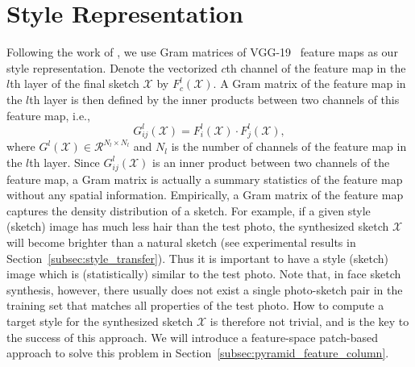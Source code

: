 \documentclass[10pt,twocolumn,letterpaper]{article}
\begin{document}
\section{Style Representation}\label{sec:motivation}
Following the work of \cite{gatys2015neural}, we use Gram matrices of VGG-19~\cite{simonyan2014very} feature maps as our style representation. Denote the vectorized $c$th channel of the feature map in the $l$th layer of the final sketch $\mathcal{X}$ by $F^{l}_{c}(\mathcal{X})$. A Gram matrix of the feature map in the $l$th layer is then defined by the inner products between two channels of this feature map, i.e.,
\begin{equation}
G^l_{ij}(\mathcal{X}) = F^l_{i}(\mathcal{X}) \cdot F^l_{j}(\mathcal{X}), %
\label{eq:Gram_element}
\end{equation}
where $G^l(\mathcal{X}) \in {\mathcal{R}^{N_l \times N_l}}$ %
and $N_l$ is the number of channels of the feature map in the $l$th layer. Since $G^l_{ij}(\mathcal{X})$ is an inner product between two channels of the feature map, a Gram matrix is actually a summary statistics of the feature map without any spatial information. Empirically, a Gram matrix of the feature map captures the density distribution of a sketch. For example, if a given style (sketch) image has much less hair than the test photo, the synthesized sketch $\mathcal{X}$ will become brighter than a natural sketch (see experimental results in Section~\ref{subsec:style_transfer}). Thus it is important to have a style (sketch) image which is (statistically) similar to the test photo. Note that, in face sketch synthesis, however, there usually does not exist a single photo-sketch pair in the training set that matches all properties of the test photo. How to compute a target style for the synthesized sketch $\mathcal{X}$ is therefore not trivial, and is the key to the success of this approach. We will introduce a feature-space patch-based approach to solve this problem in Section~\ref{subsec:pyramid_feature_column}.

\end{document}
